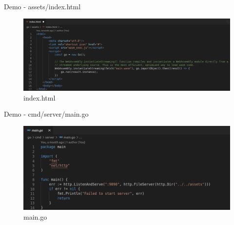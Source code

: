 \documentclass{beamer}
\begin{document}
\begin{frame}{Demo - assets/index.html}
    \begin{figure}
        \includegraphics[scale=0.2]{./images/idx.png}
        \caption{index.html}
    \end{figure}
\end{frame}

\begin{frame}{Demo - cmd/server/main.go}
    \begin{figure}
        \includegraphics[scale=0.3]{./images/server.png}
        \caption{main.go}
    \end{figure}
\end{frame}
\end{document}
